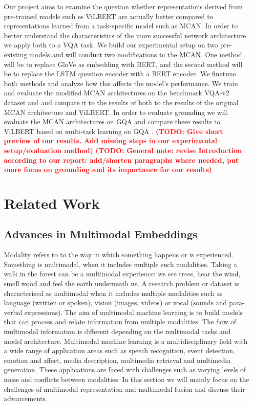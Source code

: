 \documentclass{article}
\newcommand{\todo}[1]{\textbf{\textcolor{Red}{(TODO: #1)}}}
\begin{document}
Our project aims to examine the question whether representations derived from pre-trained models such es ViLBERT are actually better compared to representations learned from a task-specific model such as MCAN. In order to better understand the characteristics of the more successful network architecture we apply both to a VQA task. We build our experimental setup on two pre-existing models and will conduct two modifications to the MCAN. One method will be to replace GloVe as embedding with BERT, and the second method will be to replace the LSTM question encoder with a BERT encoder. We finetune both methods and analyze how this affects the model’s performance. We train and evaluate the modified MCAN architectures on the benchmark VQA-v2 dataset \citep{goyal2017vqa2} and and compare it to the results of both to the results of the original MCAN architecture and ViLBERT. In order to evaluate grounding we will evaluate the MCAN architectures on GQA and compare these results to ViLBERT based on multi-task learning on GQA \citep{lu2020multitask}. \todo{Give short preview of our results. Add missing steps in our experimantal setup/evaluation method}
\todo{General note: revise Introduction according to our report: add/shorten paragraphs where needed, put more focus on grounding and its importance for our results}

\section{Related Work}
\subsection{Advances in Multimodal Embeddings} \label{embeds}
Modality refers to to the way in which something happens or is experienced. Something is multimodal, when it includes multiple such modalities. Taking a walk in the forest can be a multimodal experience: we see trees, hear the wind, smell wood and feel the earth underneath us. A research problem or dataset is characterized as multimodal when it includes multiple modalities such as language (written or spoken), vision (images, videos) or vocal (sounds and para-verbal expressions). The aim of multimodal machine learning is to build models that can process and relate information from multiple modalities. The flow of multimodal information is different depending on the multimodal tasks and model architecture. Multimodal machine learning is a multidisciplinary field with a wide range of application areas such as speech recognition, event detection, emotion and affect, media description, multimedia retrieval and multimedia generation. These applications are faced with challenges such as varying levels of noise and conflicts between modalities. In this section we will mainly focus on the challenges of multimodal representation and multimodal fusion and discuss their advancements.
\end{document}
